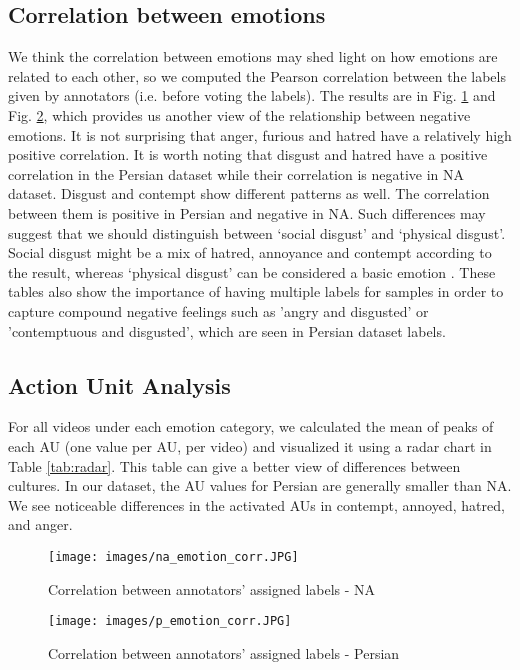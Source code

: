 \documentclass[letterpaper, 10 pt, conference]{ieeeconf}  \usepackage{FG2021}
\begin{document}
\subsection{Correlation between emotions}
We think the correlation between emotions may shed light on how emotions are related to each other, so we computed the Pearson correlation between the labels given by annotators (i.e. before voting the labels). The results are in Fig. \ref{fig:na-corr} and Fig. \ref{fig:p-corr}, which provides us another view of the relationship between negative emotions. It is not surprising that anger, furious and hatred have a relatively high positive correlation. It is worth noting that disgust and hatred have a positive correlation in the Persian dataset while their correlation is negative in NA dataset. Disgust and contempt show different patterns as well. The correlation between them is positive in Persian and negative in NA. Such differences may suggest that we should distinguish between ‘social disgust’ and ‘physical disgust’. Social disgust might be a mix of hatred, annoyance and contempt according to the result, whereas ‘physical disgust’ can be considered a basic emotion \cite{ekman1992argument}. These tables also show the importance of having multiple labels for samples in order to capture compound negative feelings such as 'angry and disgusted' or 'contemptuous and disgusted', which are seen in Persian dataset labels.

\subsection{Action Unit Analysis}
For all videos under each emotion category, we calculated the mean of peaks of each AU (one value per AU, per video) and visualized it using a radar chart in Table \ref{tab:radar}. This table can give a better view of differences between cultures. In our dataset, the AU values for Persian are generally smaller than NA. We see noticeable differences in the activated AUs in contempt, annoyed, hatred, and anger.  


\begin{figure}[t]
\centering
\texttt{[image: images/na\_emotion\_corr.JPG]}
\caption{Correlation between annotators' assigned labels - NA}
\label{fig:na-corr}
\end{figure}



\begin{figure}[t]
\centering
\texttt{[image: images/p\_emotion\_corr.JPG]}
\caption{Correlation between annotators' assigned labels - Persian}
\label{fig:p-corr}
\end{figure}
\end{document}
